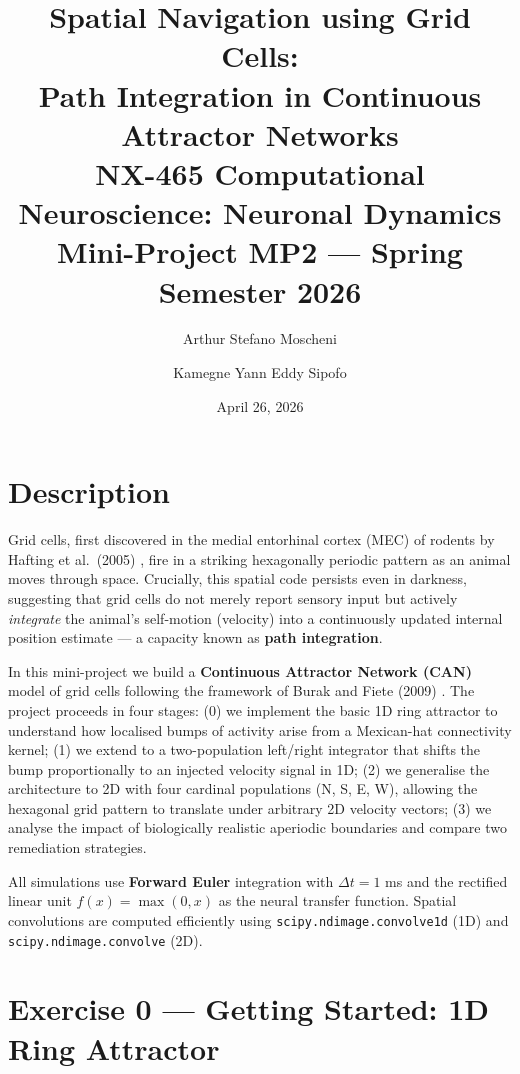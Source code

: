 \documentclass[11pt, a4paper]{article}
\title{
    \textbf{Spatial Navigation using Grid Cells:}\\
    \textbf{Path Integration in Continuous Attractor Networks}\\[0.5em]
    \large NX-465 Computational Neuroscience: Neuronal Dynamics\\
    \large Mini-Project MP2 --- Spring Semester 2026
}
\author{
    Arthur Stefano Moscheni \and Kamegne Yann Eddy Sipofo
}
\date{April 26, 2026}
\begin{document}
\maketitle
\tableofcontents
\newpage

\section{Description}

Grid cells, first discovered in the medial entorhinal cortex (MEC) of rodents by Hafting et al.\ (2005)
\cite{hafting2005}, fire in a striking hexagonally periodic pattern as an animal moves through space.
Crucially, this spatial code persists even in darkness, suggesting that grid cells do not merely report
sensory input but actively \emph{integrate} the animal's self-motion (velocity) into a continuously
updated internal position estimate --- a capacity known as \textbf{path integration}.

In this mini-project we build a \textbf{Continuous Attractor Network (CAN)} model of grid cells
following the framework of Burak and Fiete (2009) \cite{burak2009}. The project proceeds in four
stages: (0) we implement the basic 1D ring attractor to understand how localised bumps of activity
arise from a Mexican-hat connectivity kernel; (1) we extend to a two-population left/right integrator
that shifts the bump proportionally to an injected velocity signal in 1D; (2) we generalise the
architecture to 2D with four cardinal populations (N, S, E, W), allowing the hexagonal grid pattern
to translate under arbitrary 2D velocity vectors; (3) we analyse the impact of biologically realistic
aperiodic boundaries and compare two remediation strategies.

All simulations use \textbf{Forward Euler} integration with $\Delta t = 1$ ms and the rectified
linear unit $f(x) = \max(0, x)$ as the neural transfer function. Spatial convolutions are computed
efficiently using \texttt{scipy.ndimage.convolve1d} (1D) and \texttt{scipy.ndimage.convolve} (2D).

\section{Exercise 0 --- Getting Started: 1D Ring Attractor}
\end{document}
